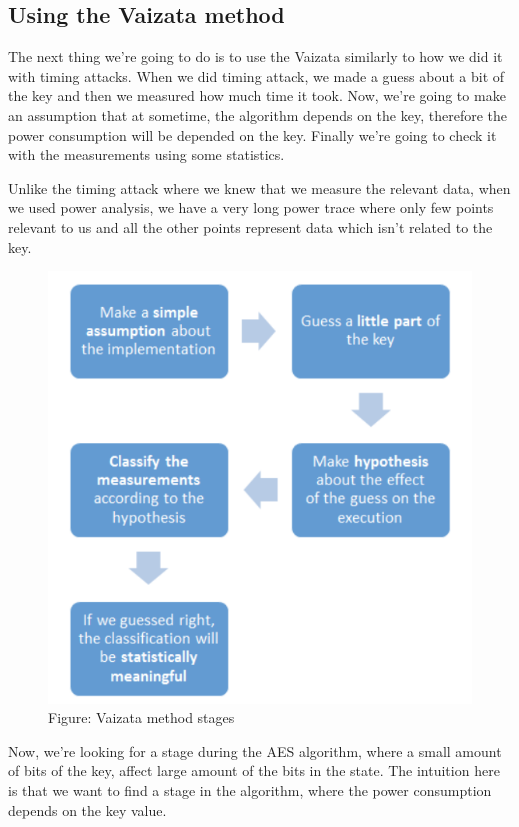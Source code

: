 \subsection{Using the Vaizata method}
The next thing we're going to do is to use the Vaizata similarly to how we did it with timing attacks. When we did timing attack, we made a guess about a bit of the key and then we measured how much time it took. Now, we're going to make an assumption that at sometime, the algorithm depends on the key, therefore the power consumption will be depended on the key. Finally we're going to check it with the measurements using some statistics. 

Unlike the timing attack where we knew that we measure the relevant data, when we used power analysis, we have a very long power trace where only few points relevant to us and all the other points represent data which isn't related to the key.

\begin{figure}[H]
\centering
\includegraphics[height=0.9\textwidth]{images/Lecture6/vaizata.png}
\caption{Figure: Vaizata method stages}
\label{fig:vaizata}
\end{figure}

Now, we're looking for a stage during the AES algorithm, where a small amount of bits of the key, affect large amount of the bits in the state. The intuition here is that we want to find a stage in the algorithm, where the power consumption depends on the key value.

